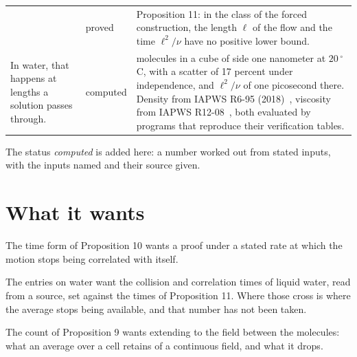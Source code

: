 \begin{longtable}{@{}>{\raggedright\arraybackslash}p{}%
>{\raggedright\arraybackslash}p{}%
>{\raggedright\arraybackslash}p{}@{}}
& proved
& Proposition 11: in the class of the forced construction, the length $\ell$ of the flow and the
time $\ell^2/\nu$ have no positive lower bound. \\[0.6em]
In water, that happens at lengths a solution passes through.
& computed
& 33.4 molecules in a cube of side one nanometer at $20\,^\circ$C, with a scatter of 17 percent
under independence, and $\ell^2/\nu$ of one picosecond there. Density from IAPWS R6-95 (2018)~\cite{src:IAPWS-R6-95-2018},
viscosity from IAPWS R12-08~\cite{src:IAPWS-R12-08}, both evaluated by programs that reproduce their
verification tables. \\
\end{longtable}

The status \emph{computed} is added here: a number worked out from stated inputs, with the inputs
named and their source given.

\section{What it wants}

The time form of Proposition 10 wants a proof under a stated rate at which the motion stops being
correlated with itself.

The entries on water want the collision and correlation times of liquid water, read from a source,
set against the times of Proposition 11. Where those cross is where the average stops being
available, and that number has not been taken.

The count of Proposition 9 wants extending to the field between the molecules: what an average over
a cell retains of a continuous field, and what it drops.
